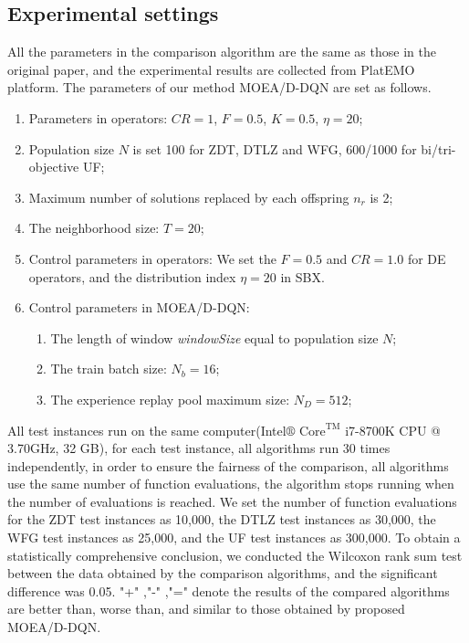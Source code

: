 \documentclass[journal]{IEEEtran}
\begin{document}
\subsection{Experimental settings}
All the parameters in the comparison algorithm are the same as those in the original paper, and the experimental results are collected from PlatEMO \cite{PlatEMO} platform.
The parameters of our method MOEA/D-DQN are set as follows.
\begin{enumerate}
  \item Parameters in operators: $CR=1$, $F=0.5$, $K=0.5$, $\eta=20$;
  \item Population size $N$ is set 100 for ZDT, DTLZ and WFG, 600/1000 for bi/tri-objective UF;
  \item Maximum number of solutions replaced by each offspring $n_r$ is 2;
  \item The neighborhood size: $T=20$;
  \item Control parameters in operators: We set the $F=0.5$ and $CR=1.0$ for DE operators, and the distribution index $\eta=20$ in SBX.
  \item Control parameters in MOEA/D-DQN:
        \begin{enumerate}
          \item The length of window \textit{windowSize} equal to population size $N$;
          \item The train batch size: $N_b = 16$;
          \item The experience replay pool maximum size: $N_D=512$;
        \end{enumerate}
\end{enumerate}

All test instances run on the same computer(Intel$\circledR$ $\text{Core}^{\text{TM}}$ i7-8700K CPU @ 3.70GHz, 32 GB), for each test instance, all algorithms run 30 times independently, in order to ensure the fairness of the comparison, all algorithms use the same number of function evaluations,
the algorithm stops running when the number of evaluations is reached.
We set the number of function evaluations for the ZDT test instances as 10,000, the DTLZ test instances as 30,000, the WFG test instances as 25,000, and the UF test instances as 300,000.
To obtain a statistically comprehensive conclusion, we conducted the Wilcoxon rank sum test between the data obtained by the comparison algorithms, and the significant difference was 0.05.
"+" ,"-" ,"=" denote the results of the compared algorithms are better than, worse than, and similar to those obtained by proposed MOEA/D-DQN.
\end{document}
